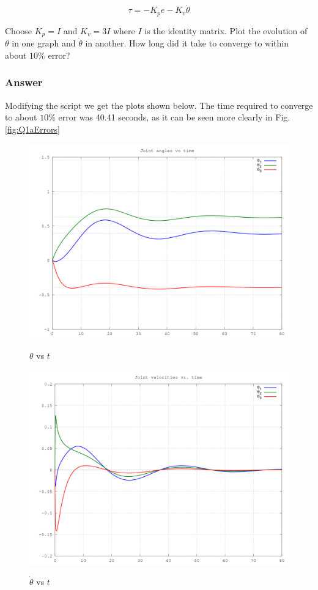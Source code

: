\documentclass[10pt,a4paper]{article}
\begin{document}
\[ \tau = -K_{p}e - K_{v}\dot{\theta} \]

Choose $K_{p} = I$ and $K_{v} = 3I$ where $I$ is the identity matrix. Plot the evolution of $\theta$ in one graph and $\dot{\theta}$ in another. How long did it take to converge to within about $10\%$ error?

\subsubsection*{Answer}
Modifying the script we get the plots shown below. The time required to converge to about $10\%$ error was 40.41 seconds, as it can be seen more clearly in Fig. \ref{fig:Q1aErrors}

\begin{figure}[H]
  \centering
  \includegraphics[angle = 0, scale = 0.3]{figures/Question1aJoints.png} 
  \label{fig:Q1aJoints}
  \caption{$\theta$ vs $t$}
\end{figure}

\begin{figure}[H]
  \centering
  \includegraphics[angle = 0, scale = 0.3]{figures/Question1aVels.png} 
  \label{fig:Q1aVels}
  \caption{$\dot{\theta}$ vs $t$}
\end{figure}
\end{document}
